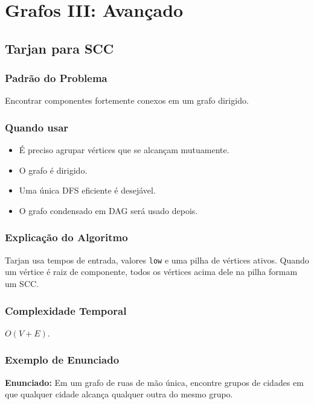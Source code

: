 \chapter{Grafos III: Avançado}

\section{Tarjan para SCC}

\subsection{Padrão do Problema}
Encontrar componentes fortemente conexos em um grafo dirigido.

\subsection{Quando usar}
\begin{itemize}[nosep]
  \item É preciso agrupar vértices que se alcançam mutuamente.
  \item O grafo é dirigido.
  \item Uma única DFS eficiente é desejável.
  \item O grafo condensado em DAG será usado depois.
\end{itemize}

\subsection{Explicação do Algoritmo}
Tarjan usa tempos de entrada, valores \texttt{low} e uma pilha de vértices ativos. Quando um vértice é raiz de componente, todos os vértices acima dele na pilha formam um SCC.

\subsection{Complexidade Temporal}
$O(V + E)$.

\subsection{Exemplo de Enunciado}
\begin{exemplodiabox}
\textbf{Enunciado:} Em um grafo de ruas de mão única, encontre grupos de cidades em que qualquer cidade alcança qualquer outra do mesmo grupo.
\end{exemplodiabox}

